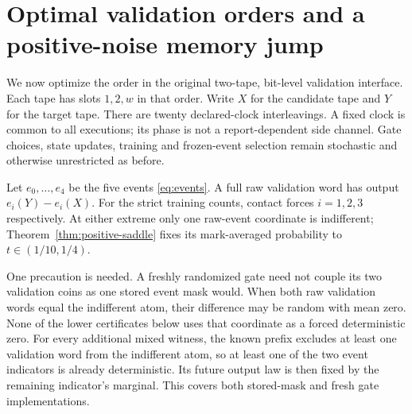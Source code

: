 \section{Optimal validation orders and a positive-noise memory jump}
\label{sec:validation-order}
We now optimize the order in the original two-tape, bit-level
validation interface. Each tape has slots $1,2,w$ in that order. Write
$X$ for the candidate tape and $Y$ for the target tape. There are twenty
declared-clock interleavings. A fixed clock is common to all executions;
its phase is not a report-dependent side channel. Gate choices, state
updates, training and frozen-event selection remain stochastic and
otherwise unrestricted as before.

Let $e_0,\ldots,e_4$ be the five events \eqref{eq:events}. A full raw
validation word has output $e_i(Y)-e_i(X)$. For the strict training
counts, contact forces $i=1,2,3$ respectively. At either extreme only
one raw-event coordinate is indifferent; Theorem~\ref{thm:positive-saddle}
fixes its mark-averaged probability to $t\in(1/10,1/4)$.

One precaution is needed. A freshly randomized gate need not couple
its two validation coins as one stored event mask would. When both raw
validation words equal the indifferent atom, their difference may be
random with mean zero. None of the lower certificates below uses that
coordinate as a forced deterministic zero. For every additional mixed
witness, the known prefix excludes at least one validation word from
the indifferent atom, so at least one of the two event indicators is
already deterministic. Its future output law is then fixed by the
remaining indicator's marginal. This covers both stored-mask and fresh
gate implementations.

